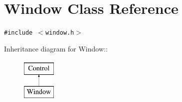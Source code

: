 \hypertarget{class_window}{
\section{Window Class Reference}
\label{class_window}
}
{\tt \#include $<$window.h$>$}

Inheritance diagram for Window::\begin{figure}[H]
\begin{center}
\leavevmode
\includegraphics[height=2cm]{class_window}
\end{center}
\end{figure}
